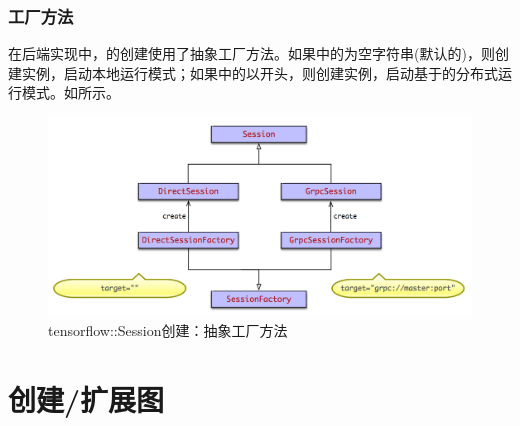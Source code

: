 \begin{content}
\subsubsection{工厂方法}

在后端\cpp{}实现中，的创建使用了抽象工厂方法。如果中的为空字符串(默认的)，则创建实例，启动本地运行模式；如果中的以开头，则创建实例，启动基于的分布式运行模式。如所示。

\begin{figure}[H]
\centering
\includegraphics[width=1.0\textwidth]{figures/cc-session-factory.png}
\caption{tensorflow::Session创建：抽象工厂方法}
 \label{fig:cc-session-factory}
\end{figure}

\end{content}

\section{创建/扩展图}

